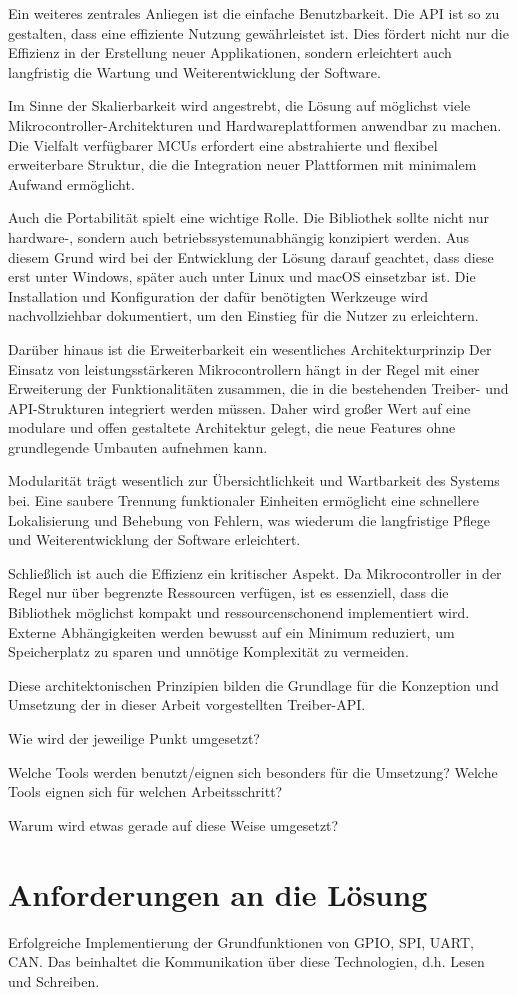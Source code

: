 Ein weiteres zentrales Anliegen ist die einfache Benutzbarkeit. 
Die API ist so zu gestalten, dass eine effiziente Nutzung gewährleistet ist. 
Dies fördert nicht nur die Effizienz in der Erstellung neuer Applikationen, sondern erleichtert auch langfristig die Wartung und Weiterentwicklung der Software.

Im Sinne der Skalierbarkeit wird angestrebt, die Lösung auf möglichst viele Mikrocontroller-Architekturen und Hardwareplattformen anwendbar zu machen.
Die Vielfalt verfügbarer MCUs erfordert eine abstrahierte und flexibel erweiterbare Struktur, die die Integration neuer Plattformen mit minimalem Aufwand ermöglicht.

Auch die Portabilität spielt eine wichtige Rolle.
Die Bibliothek sollte nicht nur hardware-, sondern auch betriebssystemunabhängig konzipiert werden.
Aus diesem Grund wird bei der Entwicklung der Lösung darauf geachtet, dass diese erst unter Windows, später auch unter Linux und macOS einsetzbar ist.
Die Installation und Konfiguration der dafür benötigten Werkzeuge wird nachvollziehbar dokumentiert, um den Einstieg für die Nutzer zu erleichtern.

Darüber hinaus ist die Erweiterbarkeit ein wesentliches Architekturprinzip
Der Einsatz von leistungsstärkeren Mikrocontrollern hängt in der Regel mit einer Erweiterung der Funktionalitäten zusammen, die in die bestehenden Treiber- und API-Strukturen integriert werden müssen.
Daher wird großer Wert auf eine modulare und offen gestaltete Architektur gelegt, die neue Features ohne grundlegende Umbauten aufnehmen kann.

Modularität trägt wesentlich zur Übersichtlichkeit und Wartbarkeit des Systems bei. 
Eine saubere Trennung funktionaler Einheiten ermöglicht eine schnellere Lokalisierung und Behebung von Fehlern, was wiederum die langfristige Pflege und Weiterentwicklung der Software erleichtert.

Schließlich ist auch die Effizienz ein kritischer Aspekt.
Da Mikrocontroller in der Regel nur über begrenzte Ressourcen verfügen, ist es essenziell, dass die Bibliothek möglichst kompakt und ressourcenschonend implementiert wird. 
Externe Abhängigkeiten werden bewusst auf ein Minimum reduziert, um Speicherplatz zu sparen und unnötige Komplexität zu vermeiden.

Diese architektonischen Prinzipien bilden die Grundlage für die Konzeption und Umsetzung der in dieser Arbeit vorgestellten Treiber-API.

Wie wird der jeweilige Punkt umgesetzt?

Welche Tools werden benutzt/eignen sich besonders für die Umsetzung?
Welche Tools eignen sich für welchen Arbeitsschritt?

Warum wird etwas gerade auf diese Weise umgesetzt?


\section{Anforderungen an die Lösung}
Erfolgreiche Implementierung der Grundfunktionen 
von GPIO, SPI, UART, CAN. Das beinhaltet die Kommunikation über diese Technologien, d.h. Lesen und Schreiben.


